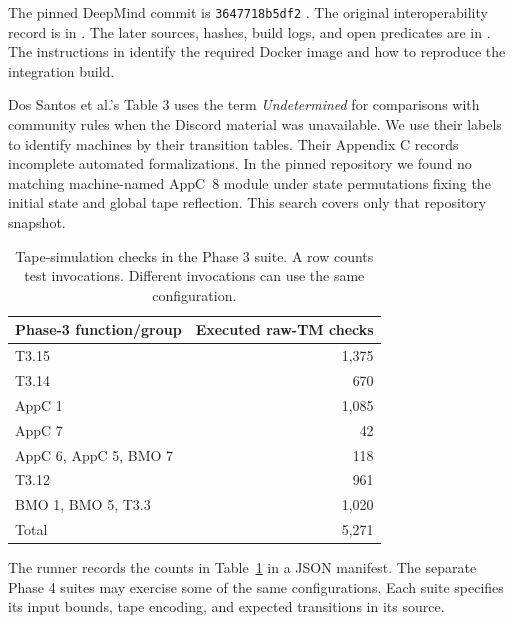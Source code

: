 \documentclass[11pt]{article}
\DeclareRobustCommand{\_}{\ifmmode\sb\else\textunderscore\allowbreak\fi}
\theoremstyle{definition}
\theoremstyle{remark}
\begin{document}
The pinned DeepMind commit is \texttt{3647718b5df2} \cite{deepmind2026cryptidsSnapshot}. The original interoperability record is in . The later sources, hashes, build logs, and open predicates are in . The instructions in  identify the required Docker image and how to reproduce the integration build.

Dos Santos et al.'s Table 3 uses the term \emph{Undetermined} for comparisons with community rules when the Discord material was unavailable. We use their labels to identify machines by their transition tables. Their Appendix C records incomplete automated formalizations. In the pinned repository we found no matching machine-named AppC~8 module under state permutations fixing the initial state and global tape reflection. This search covers only that repository snapshot.

\begin{table}[htbp]
\centering\small
\begin{tabular}{@{}lr@{}}
\toprule Phase-3 function/group & Executed raw-TM checks \\ \midrule
T3.15 & 1,375\\
T3.14 & 670\\
AppC 1 & 1,085\\
AppC 7 & 42\\
AppC 6, AppC 5, BMO 7 & 118\\
T3.12 & 961\\
BMO 1, BMO 5, T3.3 & 1,020\\ \midrule
Total & 5,271\\ \bottomrule
\end{tabular}
\caption{Tape-simulation checks in the Phase 3 suite. A row counts test invocations. Different invocations can use the same configuration.}
\label{tab:counts}
\end{table}

The runner records the counts in Table~\ref{tab:counts} in a JSON manifest. The separate Phase 4 suites may exercise some of the same configurations. Each suite specifies its input bounds, tape encoding, and expected transitions in its source.
\end{document}
